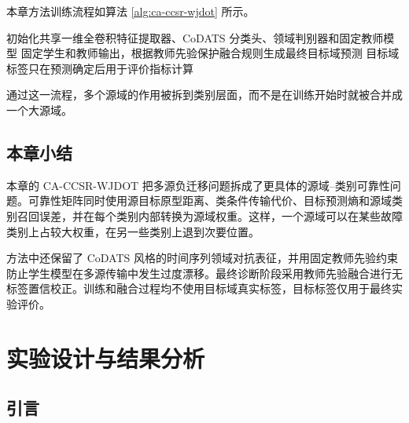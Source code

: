 \documentclass{seuthesis-2022}
\begin{document}
本章方法训练流程如算法 \ref{alg:ca-ccsr-wjdot} 所示。
\begin{algorithm}[!htbp]
    \caption{类条件源域可靠性加权多源训练流程}
    \label{alg:ca-ccsr-wjdot}
    初始化共享一维全卷积特征提取器、CoDATS 分类头、领域判别器和固定教师模型\;
    固定学生和教师输出，根据教师先验保护融合规则生成最终目标域预测\;
    目标域标签只在预测确定后用于评价指标计算\;
\end{algorithm}

通过这一流程，多个源域的作用被拆到类别层面，而不是在训练开始时就被合并成一个大源域。

\section{本章小结}

本章的 CA-CCSR-WJDOT 把多源负迁移问题拆成了更具体的源域--类别可靠性问题。可靠性矩阵同时使用源目标原型距离、类条件传输代价、目标预测熵和源域类别召回误差，并在每个类别内部转换为源域权重。这样，一个源域可以在某些故障类别上占较大权重，在另一些类别上退到次要位置。

方法中还保留了 CoDATS 风格的时间序列领域对抗表征，并用固定教师先验约束防止学生模型在多源传输中发生过度漂移。最终诊断阶段采用教师先验融合进行无标签置信校正。训练和融合过程均不使用目标域真实标签，目标标签仅用于最终实验评价。

\chapter{实验设计与结果分析}
\section{引言}
\end{document}
